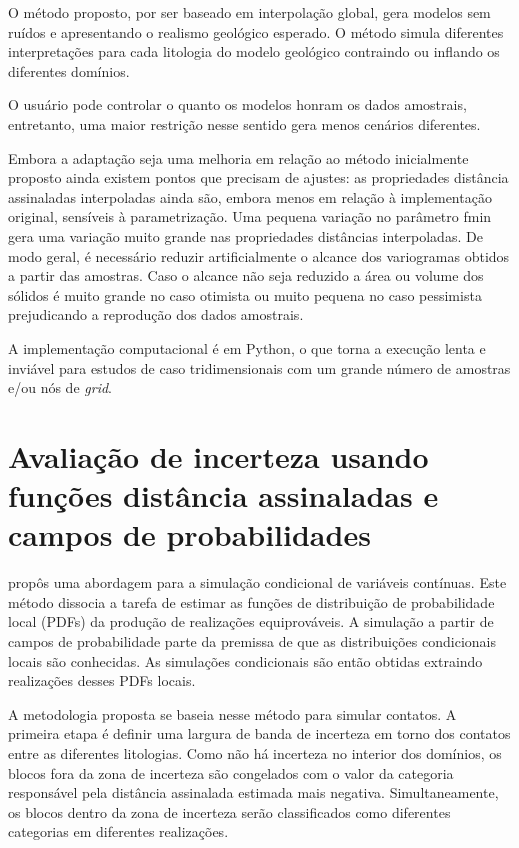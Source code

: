 O método proposto, por ser baseado em interpolação global, gera modelos sem ruídos e apresentando o realismo geológico esperado. O método simula diferentes interpretações para cada litologia do modelo geológico contraindo ou inflando os diferentes domínios. 

O usuário pode controlar o quanto os modelos honram os dados amostrais, entretanto, uma maior restrição nesse sentido gera menos cenários diferentes.

Embora a adaptação seja uma melhoria em relação ao método inicialmente proposto ainda existem pontos que precisam de ajustes: as propriedades distância assinaladas interpoladas ainda são, embora menos em relação à implementação original, sensíveis à parametrização. Uma pequena variação no parâmetro fmin gera uma variação muito grande nas propriedades distâncias interpoladas. De modo geral, é necessário reduzir artificialmente o alcance dos variogramas obtidos a partir das amostras. Caso o alcance não seja reduzido a área ou volume dos sólidos é muito grande no caso otimista ou muito pequena no caso pessimista prejudicando a reprodução dos dados amostrais.

A implementação computacional é em Python, o que torna a execução lenta e inviável para estudos de caso tridimensionais com um grande número de amostras e/ou nós de \textit{grid}.

\section{Avaliação de incerteza usando funções distância assinaladas e campos de probabilidades}\label{pfiels_sec}

 propôs uma abordagem para a simulação condicional de variáveis contínuas. Este método dissocia a tarefa de estimar as funções de distribuição de probabilidade local (PDFs) da produção de realizações equiprováveis. A simulação a partir de campos de probabilidade parte da premissa de que as distribuições condicionais locais são conhecidas. As simulações condicionais são então obtidas extraindo realizações desses PDFs locais.

A metodologia proposta se baseia nesse método para simular contatos. A primeira etapa é definir uma largura de banda de incerteza em torno dos contatos entre as diferentes litologias. Como não há incerteza no interior dos domínios, os blocos fora da zona de incerteza são congelados com o valor da categoria responsável pela distância assinalada estimada mais negativa. Simultaneamente, os blocos dentro da zona de incerteza serão classificados como diferentes categorias em diferentes realizações.

